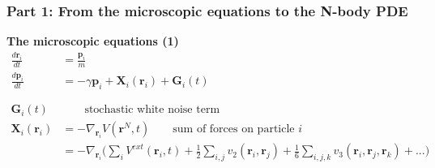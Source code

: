 \documentclass[aspectratio=169,xcolor=dvipsnames]{beamer}
\begin{document}
\begin{frame}
	\frametitle{Part 1: From the microscopic equations to the N-body PDE}
	\textbf{The microscopic equations (1)}
	\vspace{0.2cm}
    \begin{align*}
	\frac{d \mathbf{r}_i}{dt} &= \frac{\mathbf{p}_i}{m}\\
	\frac{d \mathbf{p}_i}{dt} &= - \gamma \mathbf{p}_i + \mathbf{X}_i(\mathbf{r}_i) + \mathbf{G}_i(t) \qquad \quad\\
	\\
	\\
	\mathbf{G}_i(t) &\qquad \text{stochastic white noise term}\\
	\mathbf{X}_i(\mathbf{r}_i) &= - \nabla_{\mathbf{r}_i} V(\mathbf{r}^N,t) \qquad \text{sum of forces on particle } i\\
        &= - \nabla_{\mathbf{r}_i} \bigg(\sum_i V^{ext}(\mathbf{r}_i,t) + \frac{1}{2} \sum_{i,j} v_2(\mathbf{r}_i, \mathbf{r}_j)+ \frac{1}{6} \sum_{i,j,k} v_3 (\mathbf{r}_i, \mathbf{r}_j, \mathbf{r}_k) + ... \bigg)
	\end{align*}
\end{frame}
\end{document}
